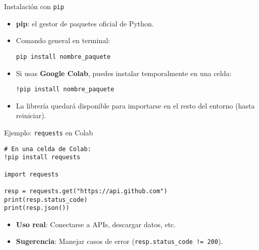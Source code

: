 \documentclass[10pt]{beamer}
\begin{document}
\begin{frame}[fragile]{Instalación con \texttt{pip}}
  \begin{itemize}
    \item \textbf{pip}: el gestor de paquetes oficial de Python.
    \item Comando general en terminal:
\begin{verbatim}
pip install nombre_paquete
\end{verbatim}
    \item Si usas \textbf{Google Colab}, puedes instalar temporalmente en una celda:
\begin{verbatim}
!pip install nombre_paquete
\end{verbatim}
    \item La librería quedará disponible para importarse en el resto del entorno (hasta reiniciar).
  \end{itemize}
\end{frame}

\begin{frame}[fragile]{Ejemplo: \texttt{requests} en Colab}
\begin{verbatim}
# En una celda de Colab:
!pip install requests

import requests

resp = requests.get("https://api.github.com")
print(resp.status_code)
print(resp.json())
\end{verbatim}
\begin{itemize}
  \item \textbf{Uso real}: Conectarse a APIs, descargar datos, etc.
  \item \textbf{Sugerencia}: Manejar casos de error (\texttt{resp.status\_code != 200}).
\end{itemize}
\end{frame}
\end{document}
